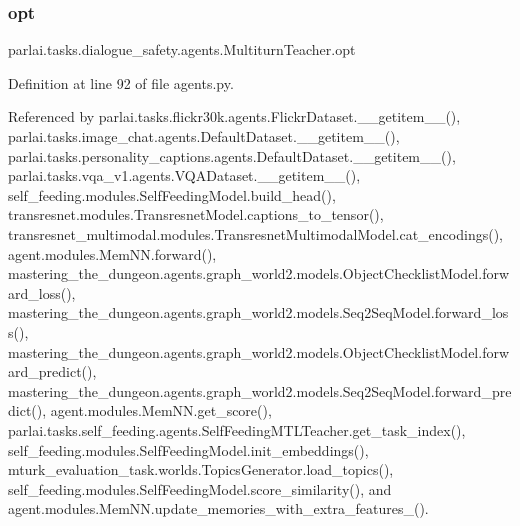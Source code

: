 \subsubsection{\texorpdfstring{opt}{opt}}
{\footnotesize\ttfamily parlai.\+tasks.\+dialogue\+\_\+safety.\+agents.\+Multiturn\+Teacher.\+opt}



Definition at line 92 of file agents.\+py.



Referenced by parlai.\+tasks.\+flickr30k.\+agents.\+Flickr\+Dataset.\+\_\+\+\_\+getitem\+\_\+\+\_\+(), parlai.\+tasks.\+image\+\_\+chat.\+agents.\+Default\+Dataset.\+\_\+\+\_\+getitem\+\_\+\+\_\+(), parlai.\+tasks.\+personality\+\_\+captions.\+agents.\+Default\+Dataset.\+\_\+\+\_\+getitem\+\_\+\+\_\+(), parlai.\+tasks.\+vqa\+\_\+v1.\+agents.\+V\+Q\+A\+Dataset.\+\_\+\+\_\+getitem\+\_\+\+\_\+(), self\+\_\+feeding.\+modules.\+Self\+Feeding\+Model.\+build\+\_\+head(), transresnet.\+modules.\+Transresnet\+Model.\+captions\+\_\+to\+\_\+tensor(), transresnet\+\_\+multimodal.\+modules.\+Transresnet\+Multimodal\+Model.\+cat\+\_\+encodings(), agent.\+modules.\+Mem\+N\+N.\+forward(), mastering\+\_\+the\+\_\+dungeon.\+agents.\+graph\+\_\+world2.\+models.\+Object\+Checklist\+Model.\+forward\+\_\+loss(), mastering\+\_\+the\+\_\+dungeon.\+agents.\+graph\+\_\+world2.\+models.\+Seq2\+Seq\+Model.\+forward\+\_\+loss(), mastering\+\_\+the\+\_\+dungeon.\+agents.\+graph\+\_\+world2.\+models.\+Object\+Checklist\+Model.\+forward\+\_\+predict(), mastering\+\_\+the\+\_\+dungeon.\+agents.\+graph\+\_\+world2.\+models.\+Seq2\+Seq\+Model.\+forward\+\_\+predict(), agent.\+modules.\+Mem\+N\+N.\+get\+\_\+score(), parlai.\+tasks.\+self\+\_\+feeding.\+agents.\+Self\+Feeding\+M\+T\+L\+Teacher.\+get\+\_\+task\+\_\+index(), self\+\_\+feeding.\+modules.\+Self\+Feeding\+Model.\+init\+\_\+embeddings(), mturk\+\_\+evaluation\+\_\+task.\+worlds.\+Topics\+Generator.\+load\+\_\+topics(), self\+\_\+feeding.\+modules.\+Self\+Feeding\+Model.\+score\+\_\+similarity(), and agent.\+modules.\+Mem\+N\+N.\+update\+\_\+memories\+\_\+with\+\_\+extra\+\_\+features\+\_\+().

\mbox{\label{classparlai_1_1tasks_1_1dialogue__safety_1_1agents_1_1MultiturnTeacher_ae472ac0fed277b530f8e38b33e0eb837}} 
